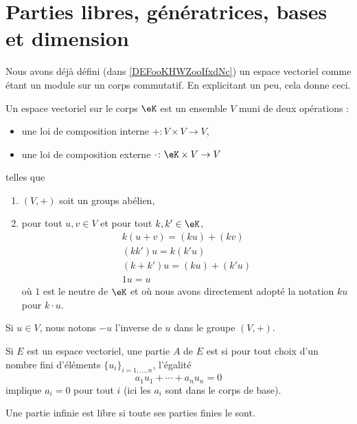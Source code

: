 
\section{Parties libres, génératrices, bases et dimension}

Nous avons déjà défini (dans \ref{DEFooKHWZooIfxdNc}) un espace vectoriel comme étant un module sur un corps commutatif. En explicitant un peu, cela donne ceci\cite{ooQLVLooEUrNLS}.

Un espace vectoriel sur le corps \( \eK\) est un ensemble \( V\) muni de deux opérations : 
\begin{itemize}
    \item une loi de composition interne \( +\colon V\times V\to V\),
    \item une loi de composition externe \( \cdot\colon \eK\times V\to V\)
\end{itemize}
telles que
\begin{enumerate}
    \item
        \( (V,+)\) soit un groups abélien,
    \item
        pour tout \( u,v\in V\) et pour tout \( k,k'\in \eK\),
        \begin{subequations}
           \begin{align}
                k(u+v)=(ku)+(kv)\\
                (kk')u=k(k'u)\\
                (k+k')u=(ku)+(k'u)\\
                1u=u
            \end{align}
        \end{subequations}
        où \( 1\) est le neutre de \( \eK\) et où nous avons directement adopté la notation \( ku\) pour \( k\cdot u\).
\end{enumerate}
Si \( u\in V\), nous notons \( -u\) l'inverse de \( u\) dans le groupe \( (V,+)\).

\begin{definition}
    Si \( E\) est un espace vectoriel, une partie \( A\) de \( E\) est  si pour tout choix d'un nombre fini d'éléments \( \{ u_i \}_{i=1,\ldots, n}\), l'égalité
    \begin{equation}
        a_1 u_1+\cdots +a_nu_n=0
    \end{equation}
    implique \( a_i=0\) pour tout \( i\) (ici les \( a_i\) sont dans le corps de base).

    Une partie infinie est libre si toute ses parties finies le sont.
\end{definition}

